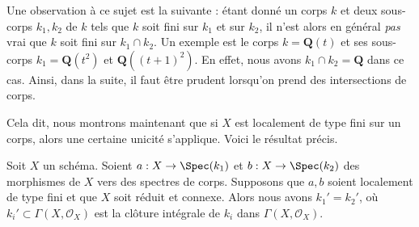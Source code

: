 \medskip\noindent
Une observation à ce sujet est la suivante : étant donné un corps
$k$ et deux sous-corps $k_1, k_2$ de $k$ tels que $k$ soit fini
sur $k_1$ et sur $k_2$, il n'est alors en général {\it pas} vrai
que $k$ soit fini sur $k_1 \cap k_2$. Un exemple est le corps
$k = \mathbf{Q}(t)$ et ses sous-corps $k_1 = \mathbf{Q}(t^2)$ et
$\mathbf{Q}((t + 1)^2)$. En effet, nous avons $k_1 \cap k_2 = \mathbf{Q}$
dans ce cas. Ainsi, dans la suite, il faut être prudent lorsqu'on prend
des intersections de corps.

\medskip\noindent
 Cela dit, nous montrons maintenant que si $X$ est localement de type
fini sur un corps, alors une certaine unicité s'applique. Voici le
résultat précis.

\begin{proposition}
\label{proposition-unique-base-field}
 Soit $X$ un schéma. Soient $a : X \to \Spec(k_1)$ et 
$b : X \to \Spec(k_2)$ des morphismes de $X$ vers des spectres de corps.
Supposons que $a, b$ soient localement de type fini et que 
$X$ soit réduit et connexe. Alors nous avons 
$k_1' = k_2'$, où $k_i' \subset \Gamma(X, \mathcal{O}_X)$
 est la clôture intégrale de $k_i$ dans $\Gamma(X, \mathcal{O}_X)$. 
\end{proposition}

